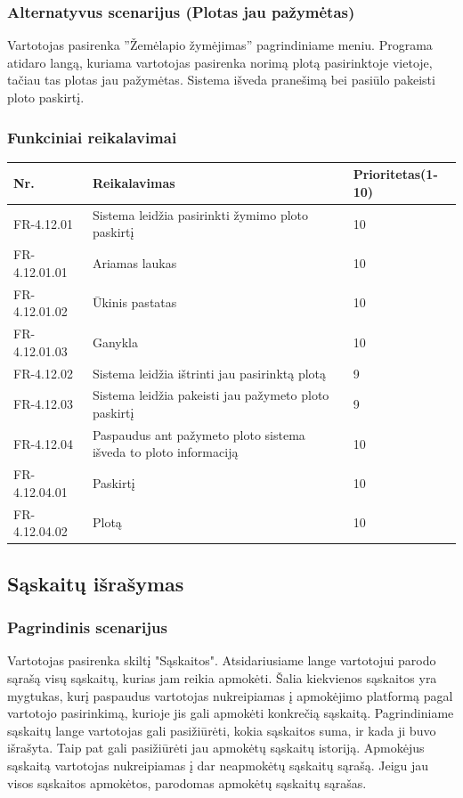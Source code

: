 \documentclass[oneside]{VUMIFPSkursinis}
\begin{document}
	\subsubsection{Alternatyvus scenarijus (Plotas jau pažymėtas)}
	Vartotojas pasirenka ''Žemėlapio žymėjimas'' pagrindiniame meniu. Programa atidaro langą, kuriama vartotojas pasirenka norimą plotą pasirinktoje vietoje, tačiau tas plotas jau pažymėtas. Sistema išveda pranešimą bei pasiūlo pakeisti ploto paskirtį.
	\subsubsection{Funkciniai reikalavimai}
	\begin{table}[htbp]
		\begin{tabularx}{1\textwidth}{ |P{2.5cm}|X|P{3cm }| }  \hline
			Nr. & Reikalavimas & Prioritetas(1-10) \\ \hline
			FR-4.12.01 & Sistema leidžia pasirinkti žymimo ploto paskirtį & 10 \\ \hline
			FR-4.12.01.01 & Ariamas laukas & 10 \\ \hline
			FR-4.12.01.02 & Ūkinis pastatas & 10 \\ \hline
			FR-4.12.01.03 & Ganykla & 10 \\ \hline
			FR-4.12.02 & Sistema leidžia ištrinti jau pasirinktą plotą & 9 \\ \hline
			FR-4.12.03 & Sistema leidžia pakeisti jau pažymeto ploto paskirtį & 9 \\ \hline
			FR-4.12.04 & Paspaudus ant pažymeto ploto sistema išveda to ploto informaciją & 10 \\ \hline
			FR-4.12.04.01 & Paskirtį & 10 \\ \hline
			FR-4.12.04.02 & Plotą & 10 \\ \hline			
		\end{tabularx}
	\end{table}
\subsection{Sąskaitų išrašymas}
	\subsubsection{Pagrindinis scenarijus}
	Vartotojas pasirenka skiltį "Sąskaitos". Atsidariusiame lange vartotojui parodo sąrašą visų sąskaitų, kurias jam reikia apmokėti. Šalia kiekvienos sąskaitos yra mygtukas, kurį paspaudus vartotojas nukreipiamas į apmokėjimo platformą pagal vartotojo pasirinkimą, kurioje jis gali apmokėti konkrečią sąskaitą. Pagrindiniame sąskaitų lange vartotojas gali pasižiūrėti, kokia sąskaitos suma, ir kada ji buvo išrašyta. Taip pat gali pasižiūrėti jau apmokėtų sąskaitų istoriją. Apmokėjus sąskaitą vartotojas nukreipiamas į dar neapmokėtų sąskaitų sąrašą. Jeigu jau visos sąskaitos apmokėtos, parodomas apmokėtų sąskaitų sąrašas.
\end{document}
